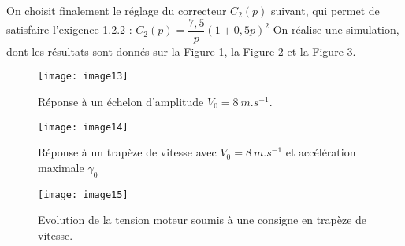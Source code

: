 On choisit finalement le réglage du correcteur $C_2 (p)$ suivant, qui permet de satisfaire l’exigence 1.2.2 :
$C_2 (p)=\dfrac{7,5}{p} (1+0,5 p)^2$
On réalise une simulation, dont les résultats sont donnés sur la Figure \ref{fig:CCMP:2021:13}, la Figure \ref{fig:CCMP:2021:14} et la Figure \ref{fig:CCMP:2021:15}. 


\begin{figure}[!h]
\centering
\texttt{[image: image13]}
\caption{\label{fig:CCMP:2021:13} Réponse à un échelon d’amplitude $V_0=\SI{8}{m.s^{-1}}$.}
\end{figure} 
 
\begin{figure}[!h]
\centering
\texttt{[image: image14]}
\caption{\label{fig:CCMP:2021:14} Réponse à un trapèze de vitesse avec $V_0=\SI{8}{m.s^{-1}}$ et accélération maximale $\gamma_0$}
\end{figure} 

\begin{figure}[!h]
\centering
\texttt{[image: image15]}
\caption{\label{fig:CCMP:2021:15} Evolution de la tension moteur soumis à une consigne en trapèze de vitesse.}
\end{figure} 



